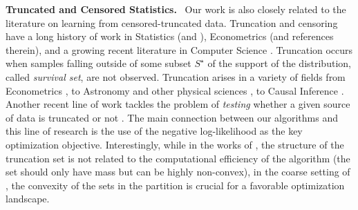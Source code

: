\documentclass[11pt,letterpaper]{article}
\theoremstyle{plain}
\theoremstyle{definition}
\theoremstyle{remark}
\renewcommand{\paragraph}[1]{\medskip \noindent\textbf{#1}~}
\begin{document}
{    \paragraph{Truncated and Censored Statistics.}
            Our work is also closely related to the literature on learning from censored-truncated data.  
            Truncation and censoring have a long history of work in Statistics \cite{Cohen91} (and \cite{Galton1897,pearson1902v,pearson1908generalised,Lee1915,fisher31,Cohen91,hannon1999estimation,raschke2012inference,maddala1986limited}), Econometrics \cite{maddala1986limited} {(and references therein)}, and a growing recent literature in Computer Science \cite{daskalakis2018efficient,daskalakis2019computationally,daskalakis2020truncated,ilyas2020theoretical,fotakis2020efficient,lee2023learning,lee2024unknown,Kontonis2019EfficientTS,daskalakis2021statistical,plevrakis2021censored,diakonikolas2024statistical,trunc_regression_unknown_var,truncatedDiscrete,truncated_sm,nagarajan2020truncatedMixtureEM,nagarajan2023EMMixtureTruncation,tai2023mixtureCensored}.
            Truncation occurs when samples falling outside of some subset $S^\star$ of the support of the distribution, called \textit{survival set}, are not observed. 
            Truncation arises in a variety of fields from Econometrics \cite{maddala1986limited}, to Astronomy and other physical sciences \cite{woodroofe1985estimating}, to Causal Inference \cite{imbens2015causal,hernan2023causal}.
            Another recent line of work tackles the problem of \textit{testing} whether a given source of data is truncated or not \cite{canonne2020learning, de2023testing, de2024detecting}. 
            The main connection between our algorithms and this line of research is the use of the negative log-likelihood as the key optimization objective. 
            Interestingly, while in the works of \cite{daskalakis2018efficient}, the structure of the truncation set is not related to the computational efficiency of the algorithm (the set should only have mass but can be highly non-convex), in the coarse setting of , the convexity of the sets in the partition is crucial for a favorable optimization landscape.





}
\end{document}

